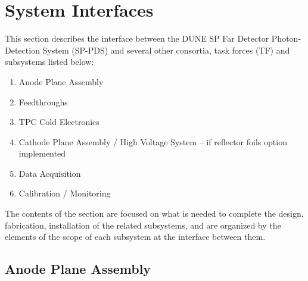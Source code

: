 \section{System Interfaces}
\label{sec:fdsp-pd-intfc}



This section describes the interface between the DUNE SP Far Detector Photon-Detection System (SP-PDS) and several other consortia, task forces (TF) and subsystems listed below:

\begin{enumerate}
\item Anode Plane Assembly
\item{Feedthroughs}
\item TPC Cold Electronics 
\item{Cathode Plane Assembly / High Voltage System -- if reflector foils option implemented}
\item Data Acquisition
\item Calibration / Monitoring
\end{enumerate}

The contents of the section are focused on what is needed to complete the design, fabrication, installation of the related subsystems, and are organized by the elements of the scope of each subsystem at the interface between them.


\subsection{Anode Plane Assembly}
\label{sec:fdsp-pd-intfc-apa}



